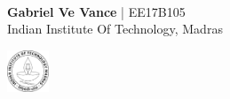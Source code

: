 \documentclass[a4paper,8pt]{article}
\begin{document}
\hspace{0.5cm}\\[-0.2cm]

\begin{minipage}{0.6\textwidth}
\large{\textbf{Gabriel Ve Vance}} | EE17B105\\
\indent \large{Indian Institute Of Technology, Madras}
\end{minipage}
\begin{minipage}{0.36\textwidth}%
\includegraphics[width=1.25cm,right]{iitm_logo.jpg}
\vspace{0.5pt}
\end{minipage}

\end{document}
